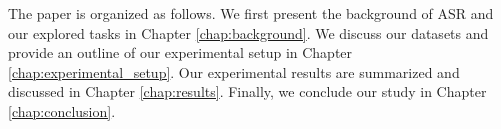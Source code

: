 The paper is organized as follows. We first present the background of ASR and our explored tasks in Chapter \ref{chap:background}. 
We discuss our datasets and provide an outline of our experimental setup in Chapter \ref{chap:experimental_setup}.
Our experimental results are summarized and discussed in Chapter \ref{chap:results}.
Finally, we conclude our study in Chapter \ref{chap:conclusion}.